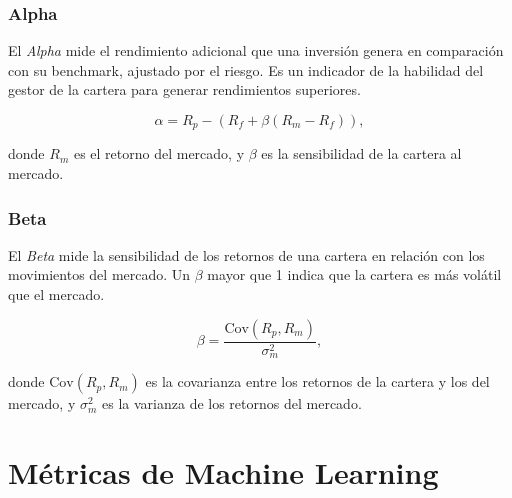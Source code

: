 \documentclass[a4paper,12pt, twoside]{report}
\begin{document}




\subsubsection{Alpha}

El \textit{Alpha} mide el rendimiento adicional que una inversión genera en comparación con su benchmark, ajustado por el riesgo. Es un indicador de la habilidad del gestor de la cartera para generar rendimientos superiores.

\begin{equation}
\alpha = R_p - \left(R_f + \beta (R_m - R_f)\right),
\end{equation}

donde $R_m$ es el retorno del mercado, y $\beta$ es la sensibilidad de la cartera al mercado.

\subsubsection{Beta}

El \textit{Beta} mide la sensibilidad de los retornos de una cartera en relación con los movimientos del mercado. Un $\beta$ mayor que 1 indica que la cartera es más volátil que el mercado.

\begin{equation}
\beta = \frac{\text{Cov}(R_p, R_m)}{\sigma^2_m},
\end{equation}

donde $\text{Cov}(R_p, R_m)$ es la covarianza entre los retornos de la cartera y los del mercado, y $\sigma^2_m$ es la varianza de los retornos del mercado.

\section{Métricas de Machine Learning}
\end{document}
